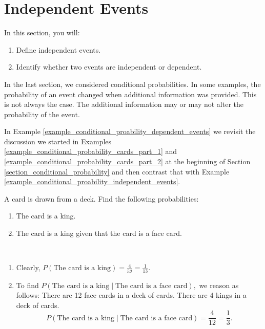 \section{Independent Events}
In this section, you will:
\begin{enumerate}
    \item Define independent events.
    \item Identify whether two events are independent or dependent.
\end{enumerate}

In the last section, we considered conditional probabilities. In some examples, the probability of an event changed when additional information was provided. This is not always the case. The additional information may or may not alter the probability of the event.

In Example \ref{example_conditional_proability_dependent_events} we revisit the discussion we started in Examples \ref{example_conditional_probability_cards_part_1} and \ref{example_conditional_probability_cards_part_2} at the beginning of Section \ref{section_conditional_probability} and then contrast that with Example \ref{example_conditional_proability_independent_events}.

\begin{example}\label{example_conditional_proability_dependent_events}
    A card is drawn from a deck. Find the following probabilities:
    \begin{enumerate}
        \item The card is a king.
        \item The card is a king given that the card is a face card.
    \end{enumerate}
\end{example}

\begin{solution}~

    \begin{enumerate}
        \item Clearly, \( P(\text{The card is a king}) = \frac{4}{52} = \frac{1}{13}. \)

        \item To find \( P(\text{The card is a king} \mid \text{The card is a face card}), \) we reason as follows:
              There are 12 face cards in a deck of cards. There are 4 kings in a deck of cards.
              \[ P(\text{The card is a king} \mid \text{The card is a face card}) = \frac{4}{12} = \frac{1}{3}. \]
    \end{enumerate}
\end{solution}


